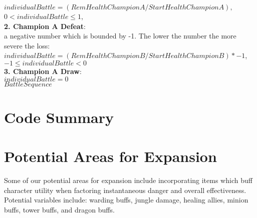 \documentclass{article}
\begin{document}
$individualBattle = (Rem Health  Champion A/ Start Health Champion A),$ \\$0< individualBattle \leq 1$,    \\
{\bf{2.  Champion A Defeat}}:\\ a negative number which is bounded by -1.  The lower the number the more severe the loss:\\
$individualBattle = (Rem Health Champion B/ Start Health Champion B) * -1$,\\ $-1 \leq individualBattle < 0$\\
{\bf{3.  Champion A Draw}}: \\
$individualBattle = 0 $\\

$Battle Sequence$




\newpage
\section{Code Summary}
\newpage
\section{Potential Areas for Expansion}
Some of our potential areas for expansion include incorporating items which buff character utility when factoring instantaneous danger and overall effectiveness.  Potential variables include: warding buffs, jungle damage, healing allies, minion buffs, tower buffs, and dragon buffs.
\end{document}
